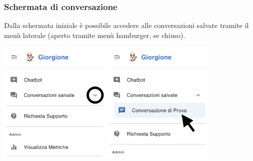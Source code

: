 \subsubsection{Schermata di conversazione}
Dalla schermata iniziale è possibile accedere alle conversazioni salvate tramite il menù laterale (aperto tramite menù hamburger, se chiuso).
\begin{center}
    \includegraphics[width=0.4\textwidth]{./img/laterale1.png}
    \hspace{0.05\textwidth}
    \includegraphics[width=0.4\textwidth]{./img/laterale2.png}
\end{center}

